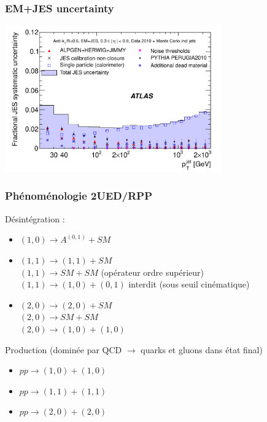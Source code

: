 \begin{frame}[plain]
\frametitle{EM+JES uncertainty}
\begin{center}
\includegraphics[width=0.7\textwidth]{Figures/JES/fig_22a_JES2010UncertaintyCentral.pdf}
\end{center}
\end{frame}

\begin{frame}[plain]
\frametitle{Phénoménologie 2UED/RPP}
\begin{maliste}
\item Désintégration : 
\begin{itemize}
\item $(1,0)\rightarrow A^{(0,1)} + SM$
\vspace*{0.2cm}
\item $(1,1)\rightarrow (1,1) + SM$\\
$(1,1)\rightarrow SM + SM$ (opérateur ordre supérieur)\\
$(1,1)\rightarrow (1,0)+(0,1)$ interdit (sous seuil cinématique)
\vspace*{0.2cm}
\item $(2,0)\rightarrow (2,0) + SM$\\
$(2,0)\rightarrow SM + SM$ \\
$(2,0)\rightarrow (1,0) + (1,0)$
\end{itemize}
\vspace*{0.2cm}
\item Production (dominée par QCD $\rightarrow$ quarks et gluons dans état final)
\begin{itemize}
\item $pp\rightarrow (1,0)+(1,0)$
\item $pp\rightarrow (1,1)+(1,1)$
\item $pp\rightarrow (2,0)+(2,0)$
\end{itemize}
\end{maliste}
\end{frame}

